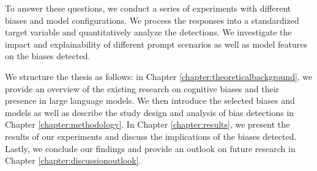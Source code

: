 \par To answer these questions, we conduct a series of experiments with different biases and model configurations. We process the responses into a standardized target variable and quantitatively analyze the detections. We investigate the impact and explainability of different prompt scenarios as well as model features on the biases detected.

\par We structure the thesis as follows: in Chapter \ref{chapter:theoreticalbackground}, we provide an overview of the existing research on cognitive biases and their presence in large language models. We then introduce the selected biases and models as well as describe the study design and analysis of bias detections in Chapter \ref{chapter:methodology}. In Chapter \ref{chapter:results}, we present the results of our experiments and discuss the implications of the biases detected. Lastly, we conclude our findings and provide an outlook on future research in Chapter \ref{chapter:discussionoutlook}.